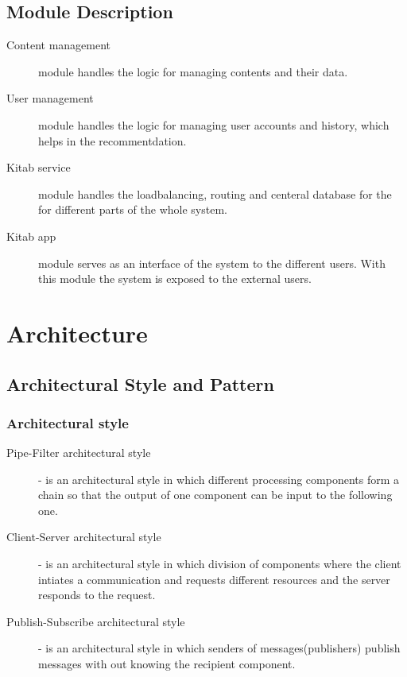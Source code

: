 	\subsection{Module Description}

	\begin{description}
		\item[Content management] module handles the logic for managing contents and their data. 
		\item[User management] module handles the logic for managing user accounts and history, which helps in the recommentdation.
		\item[Kitab service] module handles the loadbalancing, routing and centeral database for the for different parts of the whole system.
		\item[Kitab app] module serves as an interface of the system to the different users. With this module the system is exposed to the external users.
	\end{description}

\section{Architecture}
	\subsection{Architectural Style and Pattern}

		\subsubsection{Architectural style}

		\begin{description}
			\item[Pipe-Filter architectural style] - is an architectural style in which different processing components form a chain so that the output of one component can be input to the following one.
			
			\item[Client-Server architectural style] - is an architectural style in which division of components where the client intiates a communication and requests different resources and the server responds to the request.
			
			\item[Publish-Subscribe architectural style] - is an architectural style in which senders of messages(publishers) publish messages with out knowing the recipient component.
		\end{description}

